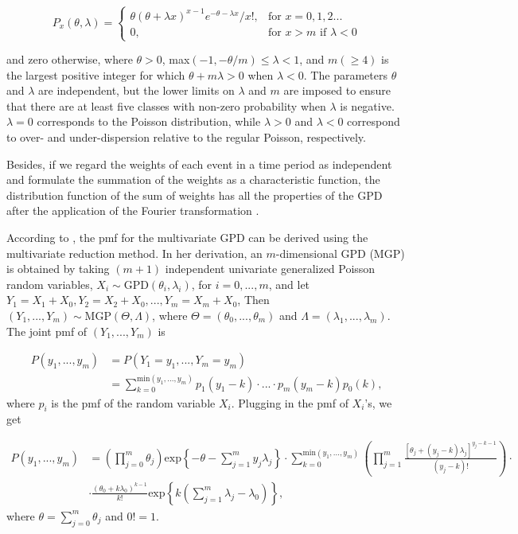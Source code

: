 \[
P_{x}(\theta,\lambda) = 
\begin{cases}
    \theta\left(\theta + \lambda x\right)^{x - 1} e^{-\theta - \lambda x} / x!, & \text{for } x= 0, 1, 2... \\
    0, & \text{for } x > m \text{ if } \lambda < 0
\end{cases}
\]

\noindent and zero otherwise, where $\theta > 0$, max$(-1, -\theta / m) \le \lambda < 1$, and $m(\ge 4)$ is the largest positive integer for which $\theta + m\lambda > 0$ when $ \lambda < 0$. The parameters $\theta$ and $\lambda$ are independent, but the lower limits on $\lambda$ and $m$ are imposed to ensure that there are at least five classes with non-zero probability when $\lambda$ is negative. $\lambda = 0$ corresponds to the Poisson distribution, while $\lambda > 0$ and $\lambda < 0$ correspond to over- and under-dispersion relative to the regular Poisson, respectively.

Besides, if we regard the weights of each event in a time period as independent and formulate the summation of the weights as a characteristic function, the distribution function of the sum of weights has all the properties of the GPD after the application of the Fourier transformation \citep{satterthwaite}.

According to \cite{vernic_2000}, the pmf for the multivariate GPD can be derived using the multivariate reduction method. In her derivation, an $m$-dimensional GPD (MGP) is obtained by taking $(m + 1)$ independent univariate generalized Poisson random variables, $X_i \sim \text{GPD}(\theta_i, \lambda_i)$, for $i = 0,..., m$, and let $Y_1 = X_1 + X_0, Y_2 = X_2 + X_0, ..., Y_m = X_m + X_0$, Then $(Y_1, ..., Y_m) \sim \text{MGP}(\Theta, \Lambda)$, where $\Theta = (\theta_0, ..., \theta_m)$ and $\Lambda = (\lambda_1, ..., \lambda_m)$. The joint pmf of $(Y_1, ..., Y_m)$ is 

$$
\begin{aligned}
P(y_1, ..., y_m) 
&= P(Y_1 = y_1, ..., Y_m = y_m) \\
&= \sum^{\text{min}(y_1, ..., y_m)}_{k = 0}p_1(y_1 - k) \cdot ... \cdot p_m(y_m - k)p_0(k),
\end{aligned}
$$
where $p_i$ is the pmf of the random variable $X_i$. Plugging in the pmf of $X_i$'s, we get

$$
\begin{aligned}
P(y_1, ..., y_m)  
&= \left(\prod_{j = 0}^m \theta_j\right)\text{exp}\left\{ -\theta -\sum^m_{j = 1}y_j\lambda_j \right\}\cdot \sum_{k = 0}^{\text{min}(y_1,...,y_m)} \left(\prod^m_{j = 1}\frac{[\theta_j + (y_j - k)\lambda_j]^{y_j - k - 1}}{(y_j - k)!}\right) \cdot \\
& \cdot\frac{(\theta_0 + k\lambda_0)^{k - 1}}{k!}\text{exp}\left\{k\left(\sum^m_{j = 1}\lambda_j - \lambda_0\right)\right\},
\end{aligned}
$$
where $\theta = \sum^m_{j = 0}\theta_j$ and $0! = 1$.


